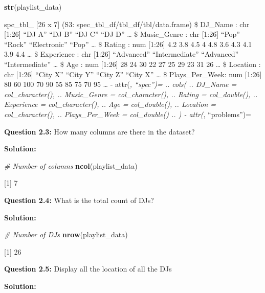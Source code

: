 \documentclass[
]{article}
\newenvironment{Shaded}{\begin{snugshade}}{\end{snugshade}}
\newcommand{\CommentTok}[1]{\textcolor[rgb]{0.56,0.35,0.01}{\textit{#1}}}
\newcommand{\FunctionTok}[1]{\textcolor[rgb]{0.13,0.29,0.53}{\textbf{#1}}}
\newcommand{\NormalTok}[1]{#1}
\newcommand{\SpecialCharTok}[1]{\textcolor[rgb]{0.81,0.36,0.00}{\textbf{#1}}}
\begin{document}
\begin{Shaded}
\begin{Highlighting}[]
\FunctionTok{str}\NormalTok{(playlist\_data)}
\end{Highlighting}
\end{Shaded}

spc\_tbl\_ {[}26 x 7{]} (S3: spec\_tbl\_df/tbl\_df/tbl/data.frame) \$
DJ\_Name : chr {[}1:26{]} ``DJ A'' ``DJ B'' ``DJ C'' ``DJ D'' \ldots{}
\$ Music\_Genre : chr {[}1:26{]} ``Pop'' ``Rock'' ``Electronic'' ``Pop''
\ldots{} \$ Rating : num {[}1:26{]} 4.2 3.8 4.5 4 4.8 3.6 4.3 4.1 3.9
4.4 \ldots{} \$ Experience : chr {[}1:26{]} ``Advanced''
``Intermediate'' ``Advanced'' ``Intermediate'' \ldots{} \$ Age : num
{[}1:26{]} 28 24 30 22 27 25 29 23 31 26 \ldots{} \$ Location : chr
{[}1:26{]} ``City X'' ``City Y'' ``City Z'' ``City X'' \ldots{} \$
Plays\_Per\_Week: num {[}1:26{]} 80 60 100 70 90 55 85 75 70 95 \ldots{}
- attr(\emph{, ``spec'')= .. cols( .. DJ\_Name = col\_character(), ..
Music\_Genre = col\_character(), .. Rating = col\_double(), ..
Experience = col\_character(), .. Age = col\_double(), .. Location =
col\_character(), .. Plays\_Per\_Week = col\_double() .. ) - attr(},
``problems'')=

\textbf{Question 2.3:} How many columns are there in the dataset?

\textbf{Solution:}

\begin{Shaded}
\begin{Highlighting}[]
\CommentTok{\# Number of columns}
\FunctionTok{ncol}\NormalTok{(playlist\_data)}
\end{Highlighting}
\end{Shaded}

{[}1{]} 7

\textbf{Question 2.4:} What is the total count of DJs?

\textbf{Solution:}

\begin{Shaded}
\begin{Highlighting}[]
\CommentTok{\# Number of DJs}
\FunctionTok{nrow}\NormalTok{(playlist\_data)}
\end{Highlighting}
\end{Shaded}

{[}1{]} 26

\textbf{Question 2.5:} Display all the location of all the DJs

\textbf{Solution:}

\begin{Shaded}
\end{Shaded}
\end{document}
